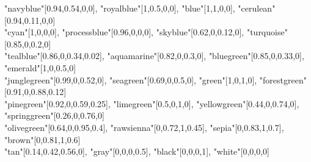 \documentclass[a4j]{ujarticle}
\begin{document}
\hspace*{2.5zw}"navyblue"[0.94,0.54,0,0],
"royalblue"[1,0.5,0,0],
"blue"[1,1,0,0],
"cerulean"[0.94,0.11,0,0]\\
\hspace*{2.5zw}"cyan"[1,0,0,0],
"processblue"[0.96,0,0,0],
"skyblue"[0.62,0,0.12,0],
"turquoise"[0.85,0,0.2,0]\\
\hspace*{2.5zw}"tealblue"[0.86,0,0.34,0.02],
"aquamarine"[0.82,0,0.3,0],
"bluegreen"[0.85,0,0.33,0],\\
\hspace*{2.5zw}"emerald"[1,0,0.5,0]\\
\hspace*{2.5zw}"junglegreen"[0.99,0,0.52,0],
"seagreen"[0.69,0,0.5,0],
"green"[1,0,1,0],
"forestgreen"[0.91,0,0.88,0.12]\\
\hspace*{2.5zw}"pinegreen"[0.92,0,0.59,0.25],
"limegreen"[0.5,0,1,0],
"yellowgreen"[0.44,0,0.74,0],\\
\hspace*{2.5zw}"springgreen"[0.26,0,0.76,0]\\
\hspace*{2.5zw}"olivegreen"[0.64,0,0.95,0.4],
"rawsienna"[0,0.72,1,0.45],
"sepia"[0,0.83,1,0.7],
"brown"[0,0.81,1,0.6]\\
\hspace*{2.5zw}"tan"[0.14,0.42,0.56,0],
"gray"[0,0,0,0.5],
"black"[0,0,0,1],
"white"[0,0,0,0]
\end{document}
